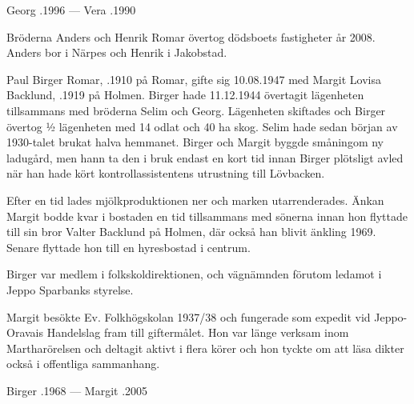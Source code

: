 Georg .1996  ---  Vera .1990





Bröderna Anders och Henrik Romar övertog dödsboets fastigheter år 2008. Anders bor i Närpes och Henrik i Jakobstad.\jhvspace{}



Paul Birger Romar, .1910 på Romar, gifte sig 10.08.1947 med Margit Lovisa Backlund, .1919 på Holmen. Birger hade 11.12.1944 övertagit lägenheten tillsammans med bröderna Selim och Georg. Lägenheten skiftades och Birger övertog ½ lägenheten med 14 odlat och 40 ha skog. Selim hade sedan början av 1930-talet brukat halva hemmanet. Birger och Margit byggde småningom ny ladugård, men hann ta den i bruk endast en kort tid innan Birger plötsligt avled när han hade kört kontrollassistentens utrustning till Lövbacken.

Efter en tid lades mjölkproduktionen ner och marken utarrenderades. Änkan Margit bodde kvar i bostaden en tid tillsammans med sönerna innan hon flyttade till sin bror Valter Backlund på Holmen, där också han blivit änkling 1969. Senare flyttade hon till en hyresbostad i centrum.

Birger var medlem i folkskoldirektionen, och vägnämnden förutom ledamot i Jeppo Sparbanks styrelse.

Margit besökte Ev. Folkhögskolan 1937/38 och fungerade som expedit vid Jeppo-Oravais Handelslag fram till giftermålet. Hon var länge verksam inom Martharörelsen och deltagit aktivt i flera körer och hon tyckte om att läsa dikter också i offentliga sammanhang.

\begin{jhchildren}
  \item {}
  \item {}
\end{jhchildren}

Birger .1968  ---  Margit .2005


